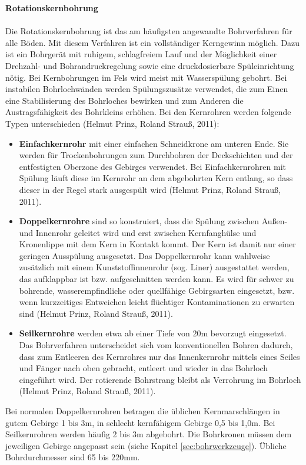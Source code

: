 \documentclass[12pt,a4paper,draft]{scrartcl} %
\begin{document}
\textbf{Rotationskernbohrung}\\\\
Die Rotationskernbohrung ist das am häufigsten angewandte Bohrverfahren für alle Böden. Mit diesem Verfahren ist ein vollständiger Kerngewinn möglich. Dazu ist ein Bohrgerät mit ruhigem, schlagfreiem Lauf und der Möglichkeit einer Drehzahl- und Bohrandruckregelung sowie eine druckdosierbare Spüleinrichtung nötig. Bei Kernbohrungen im Fels wird meist mit Wasserspülung gebohrt. Bei instabilen Bohrlochwänden werden Spülungszusätze verwendet, die zum Einen eine Stabilisierung des Bohrloches bewirken und zum Anderen die Austragsfähigkeit des Bohrkleins erhöhen. Bei den Kernrohren werden folgende Typen unterschieden (Helmut Prinz, Roland Strauß, 2011):

\begin{itemize}
\item \textbf{Einfachkernrohr }mit einer einfachen Schneidkrone am unteren Ende. Sie werden für Trockenbohrungen zum Durchbohren der Deckschichten und der entfestigten Oberzone des Gebirges verwendet. Bei Einfachkernrohren mit Spülung läuft diese im Kernrohr an dem abgebohrten Kern entlang, so dass dieser in der Regel stark ausgespült wird (Helmut Prinz, Roland Strauß, 2011).
 
\item \textbf{Doppelkernrohre } sind so konstruiert, dass die Spülung zwischen Außen- und Innenrohr geleitet wird und erst zwischen Kernfanghülse und Kronenlippe mit dem Kern in Kontakt kommt. Der Kern ist damit nur einer geringen Ausspülung ausgesetzt. Das Doppelkernrohr kann wahlweise zusätzlich mit einem Kunststoffinnenrohr (sog. Liner) ausgestattet werden, das aufklappbar ist bzw. aufgeschnitten werden kann. Es wird für schwer zu bohrende, wasserempfindliche oder quellfähige Gebirgsarten eingesetzt, bzw. wenn kurzzeitiges Entweichen leicht flüchtiger Kontaminationen zu erwarten sind (Helmut Prinz, Roland Strauß, 2011).

\item \textbf{Seilkernrohre } werden etwa ab einer Tiefe von 20m bevorzugt eingesetzt. Das Bohrverfahren unterscheidet sich vom konventionellen Bohren dadurch, dass zum Entleeren des Kernrohres nur das Innenkernrohr mittels eines Seiles und Fänger nach oben gebracht, entleert und wieder in das Bohrloch eingeführt wird. Der rotierende Bohrstrang bleibt als Verrohrung im Bohrloch (Helmut Prinz, Roland Strauß, 2011). 
\end{itemize}

Bei normalen Doppelkernrohren betragen die üblichen Kernmarschlängen in gutem Gebirge 1 bis 3m, in schlecht kernfähigem Gebirge 0,5 bis 1,0m. Bei Seilkernrohren werden häufig 2 bis 3m abgebohrt. Die Bohrkronen müssen dem jeweiligen Gebirge angepasst sein (siehe Kapitel \ref{sec:bohrwerkzeuge}). Übliche Bohrdurchmesser sind 65 bis 220mm.
\end{document}
